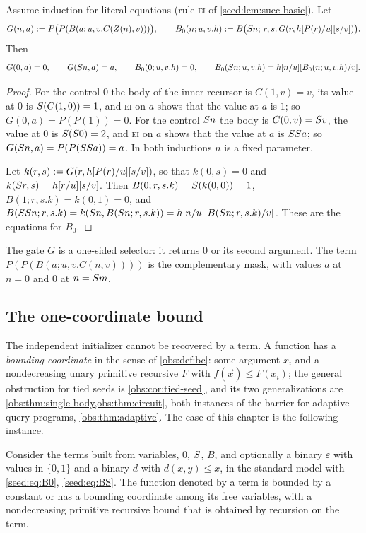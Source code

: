 \begin{lemma}\label{seed:lem:tied-gate}
Assume induction for literal equations (rule \textsc{ei} of
\cref{seed:lem:succ-basic}). Let
\[
 G(n,a)\mathrel{:=} P\bigl(P(B(a;u,v.C(Z(n),v)))\bigr),\qquad
 B_0(n;u,v.h)\mathrel{:=}
 B\bigl(S n;\,r,s.\,G(r,h[P(r)/u][s/v])\bigr).
\]
Then
\[
 G(0,a)=0,\qquad G(S n,a)=a,\qquad
 B_0(0;u,v.h)=0,\qquad
 B_0(S n;u,v.h)=h[n/u][B_0(n;u,v.h)/v].
\]
\end{lemma}

\begin{proof}
For the control $0$ the body of the inner recursor is $C(1,v)=v$, its value
at $0$ is $S(C(1,0))=1$, and \textsc{ei} on $a$ shows that the value at
$a$ is $1$; so $G(0,a)=P(P(1))=0$. For the control $S n$ the body is
$C(0,v)=S v$, the value at $0$ is $S(S 0)=2$, and \textsc{ei} on
$a$ shows that the value at $a$ is $SS a$; so
$G(S n,a)=P(P(SS a))=a$. In both inductions $n$ is a fixed
parameter.

Let $k(r,s)\mathrel{:=} G(r,h[P(r)/u][s/v])$, so that $k(0,s)=0$
and $k(S r,s)=h[r/u][s/v]$. Then
$B(0;r,s.k)=S(k(0,0))=1$, $B(1;r,s.k)=k(0,1)=0$, and
$B(SS n;r,s.k)=k(S n,B(S n;r,s.k))
=h[n/u][B(S n;r,s.k)/v]$. These are the equations for
$B_0$.
\end{proof}

The gate $G$ is a one-sided selector: it returns $0$ or its second argument.
The term $P(P(B(a;u,v.C(n,v))))$ is the complementary mask, with values $a$
at $n=0$ and $0$ at $n=S m$.

\subsection{The one-coordinate bound}

The independent initializer cannot be recovered by a term. A function has a
\emph{bounding coordinate} in the sense of \cref{obs:def:bc}: some argument
$x_i$ and a nondecreasing unary primitive recursive $F$ with
$f(\vec x)\leq F(x_i)$; the general obstruction for tied seeds is
\cref{obs:cor:tied-seed}, and its two generalizations are
\cref{obs:thm:single-body,obs:thm:circuit}, both instances of the barrier for
adaptive query programs, \cref{obs:thm:adaptive}. The case of this chapter is the
following instance.

\begin{corollary}\label{seed:thm:tied-bound}
Consider the terms built from variables, $0$, $S$, $B$, and optionally a
binary $\varepsilon$ with values in $\{0,1\}$ and a binary $d$ with
$d(x,y)\leq x$, in the standard model with \eqref{seed:eq:B0},
\eqref{seed:eq:BS}. The function denoted by a term is bounded by a constant
or has a bounding coordinate among its free variables, with a nondecreasing
primitive recursive bound that is obtained by recursion on the term.
\end{corollary}

